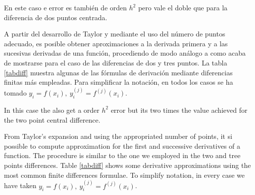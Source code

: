 \begin{paracol}{2}
En este caso e error es también de  orden $h^2$ pero vale el doble que para la diferencia de dos puntos centrada.

A partir del desarrollo de Taylor y mediante el uso del número de puntos adecuado, es posible obtener aproximaciones a la derivada primera y a las sucesivas derivadas de una función, procediendo de modo análogo a como acaba de mostrarse para el caso de las diferencias de dos y tres puntos. La tabla \ref{tabdiff} muestra algunas de las fórmulas de derivación mediante diferencias finitas más empleadas. Para simplificar la notación, en todos los casos se ha tomado $y_i=f(x_i), \ y_i^{(j)}=f^{(j)}(x_i)$.

\switchcolumn
In this case the also get a order $h^2$ error but its two times the value achieved for the two point central difference.

From Taylor's expansion and using the appropriated number of points, it si possible to compute approximation for the first and successive derivatives of a function. The procedure is similar to the one we employed in the two and tree points differences. Table \ref{tabdiff} shows some derivative approximations using the most common finite differences formulae. To simplify notation, in every case we have taken $y_i=f(x_i), \ y_i^{(j)}=f^{(j)}(x_i)$. 

\end{paracol}
